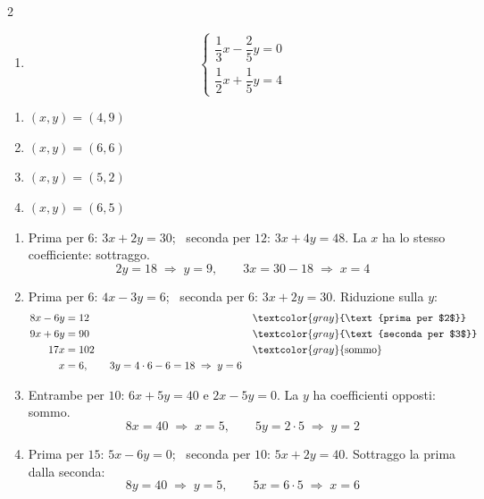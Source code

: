 \begin{question}[ID=2.4, subtitle={Sistemi con denominatori diversi}, difficulty=difficile, tags={sistemi, equazioni lineari, frazioni}]
\begin{multicols}{2}
\begin{enumerate}[leftmargin=3.2cm]
    \item
    \[
    \begin{cases}
    \dfrac{1}{3}x-\dfrac{2}{5}y=0\\
    \dfrac{1}{2}x+\dfrac{1}{5}y=4
    \end{cases}
    \]
\end{enumerate}
\end{multicols}
\begin{solution}
\begin{enumerate}
    \item $(x,y)=(4,9)$
    \item $(x,y)=(6,6)$
    \item $(x,y)=(5,2)$
    \item $(x,y)=(6,5)$
\end{enumerate}
\end{solution}
\begin{explanation}
\begin{enumerate}
    \item Prima per $6$: $3x+2y=30$; \ seconda per $12$: $3x+4y=48$. La $x$ ha lo stesso coefficiente: sottraggo.
    \[ 2y=18 \;\Rightarrow\; y=9, \qquad 3x=30-18 \;\Rightarrow\; x=4 \]
    \item Prima per $6$: $4x-3y=6$; \ seconda per $6$: $3x+2y=30$. Riduzione sulla $y$:
    \[\begin{aligned}
    8x-6y &= 12 && \textcolor{gray}{\text{prima per $2$}}\\
    9x+6y &= 90 && \textcolor{gray}{\text{seconda per $3$}}\\
    17x &= 102 && \textcolor{gray}{\text{sommo}}\\
    x &= 6, \qquad 3y=4\cdot6-6=18 \;\Rightarrow\; y=6
    \end{aligned}\]
    \item Entrambe per $10$: $6x+5y=40$ e $2x-5y=0$. La $y$ ha coefficienti opposti: sommo.
    \[ 8x=40 \;\Rightarrow\; x=5, \qquad 5y=2\cdot5 \;\Rightarrow\; y=2 \]
    \item Prima per $15$: $5x-6y=0$; \ seconda per $10$: $5x+2y=40$. Sottraggo la prima dalla seconda:
    \[ 8y=40 \;\Rightarrow\; y=5, \qquad 5x=6\cdot5 \;\Rightarrow\; x=6 \]
\end{enumerate}
\end{explanation}
\end{question}


